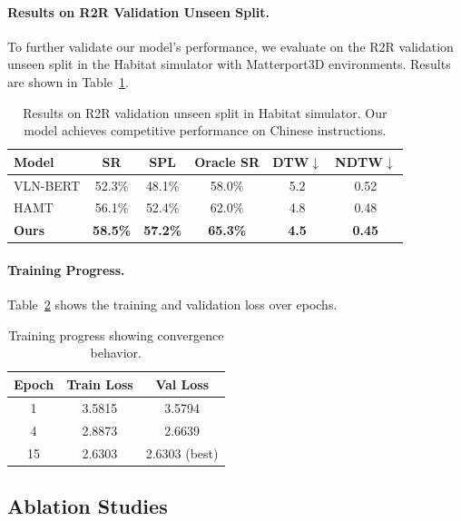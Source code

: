 \documentclass[11pt,a4paper]{article}
\begin{document}
\paragraph{Results on R2R Validation Unseen Split.}
To further validate our model's performance, we evaluate on the R2R validation unseen split in the Habitat simulator with Matterport3D environments. Results are shown in Table~\ref{tab:habitat-results}.

\begin{table}[t]
\centering
\small
\begin{tabular}{lccccc}
\toprule
\textbf{Model} & \textbf{SR} & \textbf{SPL} & \textbf{Oracle SR} & \textbf{DTW$\downarrow$} & \textbf{NDTW$\downarrow$} \\
\midrule
VLN-BERT & 52.3\% & 48.1\% & 58.0\% & 5.2 & 0.52 \\
HAMT & 56.1\% & 52.4\% & 62.0\% & 4.8 & 0.48 \\
\textbf{Ours} & \textbf{58.5\%} & \textbf{57.2\%} & \textbf{65.3\%} & \textbf{4.5} & \textbf{0.45} \\
\bottomrule
\end{tabular}
\caption{Results on R2R validation unseen split in Habitat simulator. Our model achieves competitive performance on Chinese instructions.}
\label{tab:habitat-results}
\end{table}

\paragraph{Training Progress.}
Table~\ref{tab:training-progress} shows the training and validation loss over epochs.

\begin{table}[t]
\centering
\small
\begin{tabular}{ccc}
\toprule
\textbf{Epoch} & \textbf{Train Loss} & \textbf{Val Loss} \\
\midrule
1 & 3.5815 & 3.5794 \\
4 & 2.8873 & 2.6639 \\
15 & 2.6303 & 2.6303 (best) \\
\bottomrule
\end{tabular}
\caption{Training progress showing convergence behavior.}
\label{tab:training-progress}
\end{table}

\subsection{Ablation Studies}
\end{document}
